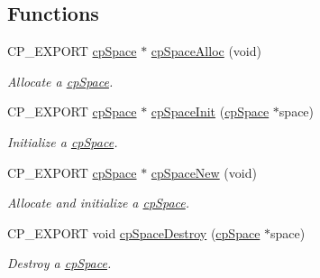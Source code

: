 \subsection*{Functions}
\begin{DoxyCompactItemize}
\item 
\mbox{\label{group__cpSpace_gaa233bc692b8773035e0b7af246f1785f}} 
C\+P\+\_\+\+E\+X\+P\+O\+RT \hyperlink{structcpSpace}{cp\+Space} $\ast$ \hyperlink{group__cpSpace_gaa233bc692b8773035e0b7af246f1785f}{cp\+Space\+Alloc} (void)
\begin{DoxyCompactList}\small\item\em Allocate a \hyperlink{structcpSpace}{cp\+Space}. \end{DoxyCompactList}\item 
\mbox{\label{group__cpSpace_ga4f6c77afe3cef0d06df38b7aa8d70354}} 
C\+P\+\_\+\+E\+X\+P\+O\+RT \hyperlink{structcpSpace}{cp\+Space} $\ast$ \hyperlink{group__cpSpace_ga4f6c77afe3cef0d06df38b7aa8d70354}{cp\+Space\+Init} (\hyperlink{structcpSpace}{cp\+Space} $\ast$space)
\begin{DoxyCompactList}\small\item\em Initialize a \hyperlink{structcpSpace}{cp\+Space}. \end{DoxyCompactList}\item 
\mbox{\label{group__cpSpace_ga2d7724bac5766902583bfc4a4f06ca32}} 
C\+P\+\_\+\+E\+X\+P\+O\+RT \hyperlink{structcpSpace}{cp\+Space} $\ast$ \hyperlink{group__cpSpace_ga2d7724bac5766902583bfc4a4f06ca32}{cp\+Space\+New} (void)
\begin{DoxyCompactList}\small\item\em Allocate and initialize a \hyperlink{structcpSpace}{cp\+Space}. \end{DoxyCompactList}\item 
\mbox{\label{group__cpSpace_gaaf1097ee4fb04f32c4e82271d7603d26}} 
C\+P\+\_\+\+E\+X\+P\+O\+RT void \hyperlink{group__cpSpace_gaaf1097ee4fb04f32c4e82271d7603d26}{cp\+Space\+Destroy} (\hyperlink{structcpSpace}{cp\+Space} $\ast$space)
\begin{DoxyCompactList}\small\item\em Destroy a \hyperlink{structcpSpace}{cp\+Space}. \end{DoxyCompactList}\item 

\end{DoxyCompactItemize}
